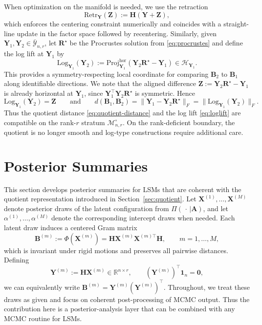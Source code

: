 \documentclass[12pt]{article}
\newcommand{\calH}{\mathcal{H}}
\newcommand{\calY}{\mathcal{Y}}
\newcommand{\calMnro}{\mathcal{M}^{\circ}_{n,r}} %
\newcommand{\bbR}{\mathbb{R}}
\newcommand{\bfA}{\boldsymbol{A}}
\newcommand{\bfB}{\boldsymbol{B}}
\newcommand{\bfH}{\boldsymbol{H}}
\newcommand{\bfR}{\boldsymbol{R}}
\newcommand{\bfX}{\boldsymbol{X}}
\newcommand{\bfY}{\boldsymbol{Y}}
\newcommand{\bfZ}{\boldsymbol{Z}}
\newcommand{\bfone}{\boldsymbol{1}}
\newcommand{\bfzero}{\boldsymbol{0}}
\newcommand{\Log}{\mathrm{Log}}
\begin{document}
When optimization on the manifold is needed, we use the retraction
\citep{absil_2008_OptimizationAlgorithmsMatrix}
\begin{equation}\label{eq:retraction}
\mathrm{Retr}_{\bfY}(\bfZ):=\bfH(\bfY+\bfZ),
\end{equation}
which enforces the centering constraint numerically and coincides with a straight-line update in the
factor space followed by recentering. Similarly, given $\bfY_1,\bfY_2\in\bar{\calY}_{n,r}$, let
$\bfR^\star$ be the Procrustes solution from \eqref{eq:procrustes} and define the log lift at
$\bfY_1$ by
\begin{equation}\label{eq:loglift}
\Log_{\bfY_1}(\bfY_2)
:=
\mathrm{Proj}^{\mathrm{hor}}_{\bfY_1}(\bfY_2\bfR^\star-\bfY_1)\in \calH_{\bfY_1}.
\end{equation}
This provides a symmetry-respecting local coordinate for comparing $\bfB_2$ to $\bfB_1$ along
identifiable directions. We note that  the aligned difference $\bfZ:=\bfY_2\bfR^\star-\bfY_1$ is already horizontal at $\bfY_1$,
since $\bfY_1^\top\bfY_2\bfR^\star$ is symmetric. Hence
\[
\Log_{\bfY_1}(\bfY_2)=\bfZ
\qquad\text{and}\qquad
d(\bfB_1,\bfB_2)=\|\bfY_1-\bfY_2\bfR^\star\|_F=\|\Log_{\bfY_1}(\bfY_2)\|_F.
\]
Thus the quotient distance \eqref{eq:quotient-distance} and the log lift
\eqref{eq:loglift} are compatible on the rank-$r$ stratum $\calMnro$. On the rank-deficient
boundary, the quotient is no longer smooth and log-type constructions require additional care.
\section{Posterior Summaries}\label{sec:summaries}

This section develops posterior summaries for LSMs that are coherent with the quotient
representation introduced in Section~\ref{sec:quotient}. Let
$\bfX^{(1)},\ldots,\bfX^{(M)}$ denote posterior draws of the latent configuration from
$\Pi(\,\cdot\,\vert \bfA)$, and let
$\alpha^{(1)},\ldots,\alpha^{(M)}$ denote the corresponding intercept draws when needed.
Each latent draw induces a centered Gram matrix
\[
\bfB^{(m)} := \Phi(\bfX^{(m)})=\bfH \bfX^{(m)}\bfX^{(m)\top}\bfH,\qquad m=1,\ldots,M,
\]
which is invariant under rigid motions and preserves all pairwise distances. Defining
\[
\bfY^{(m)}:=\bfH\bfX^{(m)}\in\bbR^{n\times r},
\qquad (\bfY^{(m)})^\top\bfone_n=\bfzero,
\]
we can equivalently write $\bfB^{(m)}=\bfY^{(m)}(\bfY^{(m)})^\top$. Throughout, we treat these
draws as given and focus on coherent post-processing of MCMC output. Thus the contribution here is a
posterior-analysis layer that can be combined with any MCMC routine for LSMs.
\end{document}
